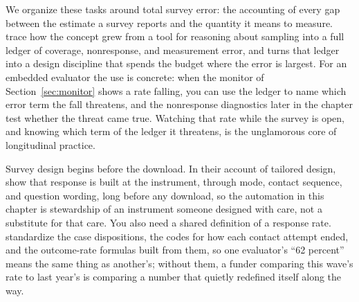 \documentclass[
    a4paper,
    fontsize=10pt,
    twoside=true,
    numbers=noenddot,
]{kaobook}
\begin{document}
We organize these tasks around total survey error: the accounting of every gap between the estimate a survey reports and the quantity it means to measure. \textcite{groves2010tse} trace how the concept grew from a tool for reasoning about sampling into a full ledger of coverage, nonresponse, and measurement error, and \textcite{biemer2010tse} turns that ledger into a design discipline that spends the budget where the error is largest. For an embedded evaluator the use is concrete: when the monitor of Section~\ref{sec:monitor} shows a rate falling, you can use the ledger to name which error term the fall threatens, and the nonresponse diagnostics later in the chapter test whether the threat came true. Watching that rate while the survey is open, and knowing which term of the ledger it threatens, is the unglamorous core of longitudinal practice.

Survey design begins before the download. In their account of tailored design, \textcite{dillman2014tailored} show that response is built at the instrument, through mode, contact sequence, and question wording, long before any download, so the automation in this chapter is stewardship of an instrument someone designed with care, not a substitute for that care. You also need a shared definition of a response rate. \textcite{aapor2023standard} standardize the case dispositions, the codes for how each contact attempt ended, and the outcome-rate formulas built from them, so one evaluator's ``62 percent'' means the same thing as another's; without them, a funder comparing this wave's rate to last year's is comparing a number that quietly redefined itself along the way.
\end{document}
